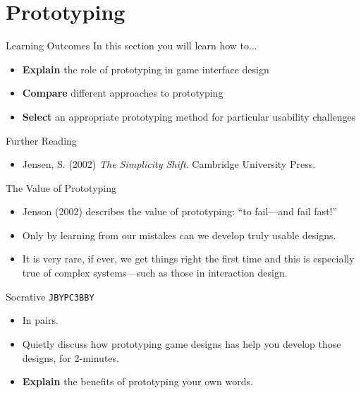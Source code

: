 \part{Prototyping}
\frame{\partpage}

\begin{frame}{Learning Outcomes}
	In this section you will learn how to...
	
	\begin{itemize}
		\item \textbf{Explain} the role of prototyping in game interface design
		\item \textbf{Compare} different approaches to prototyping
		\item \textbf{Select} an appropriate prototyping method for particular usability challenges
	\end{itemize}
\end{frame}

\begin{frame}{Further Reading}
	\begin{itemize}
		\item Jensen, S. (2002) \textit{The Simplicity Shift}. Cambridge University Press.
	\end{itemize}
\end{frame}

\begin{frame}{The Value of Prototyping}
	\begin{itemize}
		\item Jenson (2002) describes the value of prototyping: ``to fail---and fail fast!''
		\item Only by learning from our mistakes can we develop truly usable designs. 
		\item It is very rare, if ever, we get things right the first time and this is especially true of complex systems---such as those in interaction design.
	\end{itemize}
\end{frame}

\begin{frame}[fragile]{Socrative \texttt{JBYPC3BBY}}
	\begin{itemize}
		\item In pairs.
		\item Quietly discuss how prototyping game designs has help you develop those designs, for 2-minutes.
		\item \textbf{Explain} the benefits of prototyping your own words.
	\end{itemize}
\end{frame}

